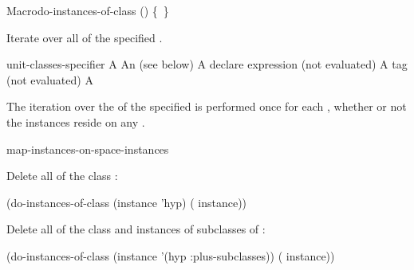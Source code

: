 \documentclass[10pt,twoside,english,pdftex]{article}
\begin{document}
\begin{functiondoc}{Macro}{do-instances-of-class}%
{()   
  \superstar{} 
  \mbox{\{ \vbar{} \}\superstar}}
%
%

\fnsyntax

\fnpurpose Iterate over all  of the specified
.

\fnpackage {}

\fnmodule {}

\fnargs
\begin{args}{unit-classes-specifier}
\arg[var] A 
 An 
(see below)
\arg[declaration] A declare expression (not evaluated)
\arg[tag] A  tag (not evaluated)
\arg[form] A 
\end{args}

\fndsyntax
\W\supp\tabletop
\unitclassesspec
\subclassingspec

\fndescription The iteration over the  of the specified
 is performed once for each , whether
or not the instances reside on any .

\begin{alsos}{map-instances-on-space-instances}
\end{alsos}

\fnexamples
Delete all  of the class :
%
\W\supp
\begin{example}
  (do-instances-of-class (instance 'hyp)
    ( instance))
\end{example} 
%
Delete all  of the class  and
instances of subclasses of :
%
\W\supp\notpretop
\begin{example}
  (do-instances-of-class (instance '(hyp :plus-subclasses))
    ( instance))
\end{example} 


\end{functiondoc}
\end{document}
